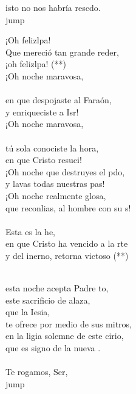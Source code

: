 \begin{cancion}
	isto no nos habría rescdo.\\jump\\
	\begin{chorus}%
	¡Oh felizlpa!\\
	Que mereció tan grande reder,\\
	¡oh felizlpa! (**)\\
	¡Oh noche maravosa,\\
	\jump\\
en que despojaste al Faraón,\\
	y enriqueciste a Isr!\\
	¡Oh noche maravosa,\\
	\jump\\
tú sola conociste la hora,\\
	en que Cristo resuci!\\
	¡Oh noche que destruyes el pdo,\\
	y lavas todas nuestras pas!\\
	¡Oh noche realmente glosa,\\
	que reconlias, al hombre con su s!\\
	\jump\\
	Esta es la he,\\
	en que Cristo ha vencido a la rte\\
	y del inerno, retorna victoso (**)\\
	\end{chorus}%
	\jump\\
	esta noche acepta Padre to,\\
	este sacrificio de alaza,\\
	que la Iesia,\\
	te ofrece por medio de sus mitros,\\
	en la ligia solemne de este cirio,\\
	que es signo de la nueva .\\
	\jump\\
	Te rogamos, Ser,\\jump\\
	\begin{chorus}%

\end{chorus}
\end{cancion}
